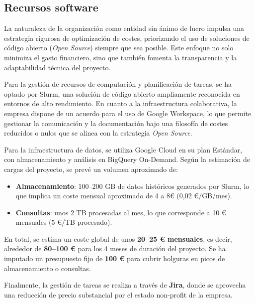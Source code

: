\subsection{Recursos software}
La naturaleza de la organización como entidad sin ánimo de lucro impulsa una estrategia 
rigurosa de optimización de costes, priorizando el uso de soluciones de código abierto 
(\textit{Open Source}) siempre que sea posible. Este enfoque no solo minimiza el gasto 
financiero, sino que también fomenta la transparencia y la adaptabilidad técnica del proyecto.

Para la gestión de recursos de computación y planificación de tareas, se ha optado por 
Slurm, una solución de código abierto ampliamente reconocida en entornos de alto 
rendimiento. En cuanto a la infraestructura colaborativa, la empresa dispone de un acuerdo 
para el uso de Google Workspace, lo que permite gestionar la comunicación y la 
documentación bajo una filosofía de costes reducidos o nulos que se alinea con la estrategia 
\textit{Open Source}.

Para la infraestructura de datos, se utiliza Google Cloud en su plan Estándar, con 
almacenamiento y análisis en BigQuery On-Demand. Según la estimación de cargas del 
proyecto, se prevé un volumen aproximado de:
\begin{itemize}
    \item \textbf{Almacenamiento}: 100--200 GB de datos históricos generados por Slurm, lo que implica un coste mensual aproximado de 4 a 8€ (0,02 €/GB/mes).
    \item \textbf{Consultas}: unos 2 TB procesadas al mes, lo que corresponde a 10 € mensuales (5 €/TB procesado).
\end{itemize}

En total, se estima un coste global de unos \textbf{20–25 € mensuales}, es decir, alrededor de \textbf{80–100 €} para los 4 meses de duración del proyecto. Se ha imputado un presupuesto fijo de \textbf{100 €} para cubrir holguras en picos de almacenamiento o consultas.

Finalmente, la gestión de tareas se realiza a través de \textbf{Jira}, donde se aprovecha una reducción de precio substancial por el estado non-profit de la empresa.

